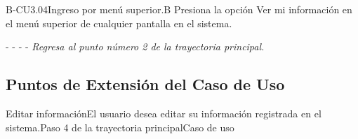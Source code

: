 	\begin{UCtrayectoriaA}{B-CU3.04}{Ingreso por menú superior.}{B}
	    \UCpaso[\UCactor]Presiona la opción Ver mi información en el menú superior de cualquier pantalla en el sistema. %
	    \item[- -] - - {\em Regresa al punto número 2 de la trayectoria principal.}
	\end{UCtrayectoriaA}
	
	\subsection{Puntos de Extensión del Caso de Uso}
	
	\begin{UCExtenssionPoint}{Editar información}{El usuario desea editar su información registrada en el sistema.}{Paso 4 de la trayectoria principal}{Caso de uso } 
	\end{UCExtenssionPoint}
	
